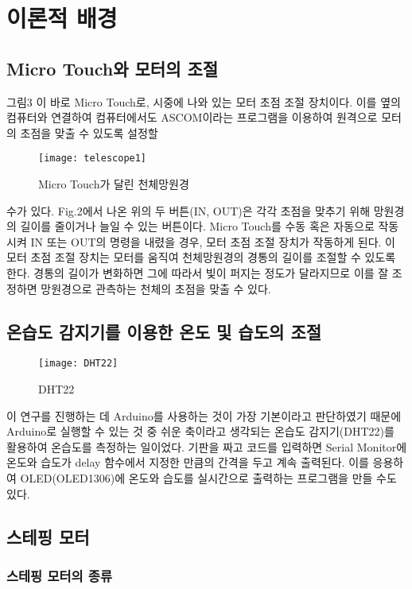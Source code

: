 \section{이론적 배경}

\subsection{Micro Touch와 모터의 조절}

그림3 이 바로 Micro Touch로, 시중에 나와 있는 모터 초점 조절 장치이다. 이를 옆의 컴퓨터와 연결하여 컴퓨터에서도 ASCOM이라는 프로그램을 이용하여 원격으로 모터의 초점을 맞출 수 있도록 설정할 
\begin{wrapfigure}{l}{0.25\textwidth}
	\texttt{[image: telescope1]}
	\caption{Micro Touch가 달린 천체망원경}
	\label{fig:telescope1}
\end{wrapfigure}
수가 있다. Fig.2에서 나온 위의 두 버튼(IN, OUT)은 각각 초점을 맞추기 위해 망원경의 길이를 줄이거나 늘일 수 있는 버튼이다. Micro Touch를 수동 혹은 자동으로 작동시켜 IN 또는 OUT의 명령을 내렸을 경우, 모터 초점 조절 장치가 작동하게 된다. 이 모터 초점 조절 장치는 모터를 움직여 천체망원경의 경통의 길이를 조절할 수 있도록 한다. 경통의 길이가 변화하면 그에 따라서 빛이 퍼지는 정도가 달라지므로 이를 잘 조정하면 망원경으로 관측하는 천체의 초점을 맞출 수 있다.

\subsection{온습도 감지기를 이용한 온도 및 습도의 조절}

\begin{wrapfigure}{l}{0.05\textwidth}
	\texttt{[image: DHT22]}
	\caption{DHT22}
	\label{fig:DHT22}
\end{wrapfigure}
이 연구를 진행하는 데 Arduino를 사용하는 것이 가장 기본이라고 판단하였기 때문에 Arduino로 실행할 수 있는 것 중 쉬운 축이라고 생각되는 온습도 감지기(DHT22)를 활용하여 온습도를 측정하는 일이었다. 기판을 짜고 코드를 입력하면 Serial Monitor에 온도와 습도가 delay 함수에서 지정한 만큼의 간격을 두고 계속 출력된다. 이를 응용하여 OLED(OLED1306)에 온도와 습도를 실시간으로 출력하는 프로그램을 만들 수도 있다.

\subsection{스테핑 모터}

\subsubsection{스테핑 모터의 종류}

